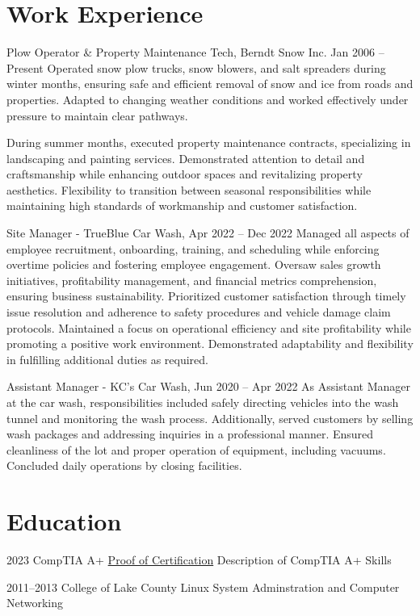 \documentclass{simplecv}
\begin{document}
\section{Work Experience}
\begin{topic}
\item[Plow Operator \& Property Maintenance Tech, Berndt Snow Inc. Jan 2006 -- Present]
Operated snow plow trucks, snow blowers, and salt spreaders during winter months, ensuring safe and efficient removal of snow and ice from roads and properties. Adapted to changing weather conditions and worked effectively under pressure to maintain clear pathways.

During summer months, executed property maintenance contracts, specializing in landscaping and painting services. Demonstrated attention to detail and craftsmanship while enhancing outdoor spaces and revitalizing property aesthetics. Flexibility to transition between seasonal responsibilities while maintaining high standards of workmanship and customer satisfaction.
\end{topic}

\begin{topic}
\item[Site Manager - TrueBlue Car Wash, Apr 2022 -- Dec 2022]
Managed all aspects of employee recruitment, onboarding, training, and scheduling while enforcing overtime policies and fostering employee engagement. Oversaw sales growth initiatives, profitability management, and financial metrics comprehension, ensuring business sustainability. Prioritized customer satisfaction through timely issue resolution and adherence to safety procedures and vehicle damage claim protocols. Maintained a focus on operational efficiency and site profitability while promoting a positive work environment. Demonstrated adaptability and flexibility in fulfilling additional duties as required.
\end{topic}

\begin{topic}
\item[Assistant Manager - KC's Car Wash, Jun 2020 -- Apr 2022]
As Assistant Manager at the car wash, responsibilities included safely directing vehicles into the wash tunnel and monitoring the wash process. Additionally, served customers by selling wash packages and addressing inquiries in a professional manner. Ensured cleanliness of the lot and proper operation of equipment, including vacuums. Concluded daily operations by closing facilities.
\end{topic}

\section{Education}

\begin{topic}
\item[2023 CompTIA A+]
\href{https://drive.google.com/file/d/1AEhKVefmBUfZywOPLIuJx9v0ueqqA3CI/view?usp=sharing}{Proof of Certification}
Description of CompTIA A+ Skills

\item[2011--2013 College of Lake County]
Linux System Adminstration and Computer Networking
\end{topic}
\end{document}
